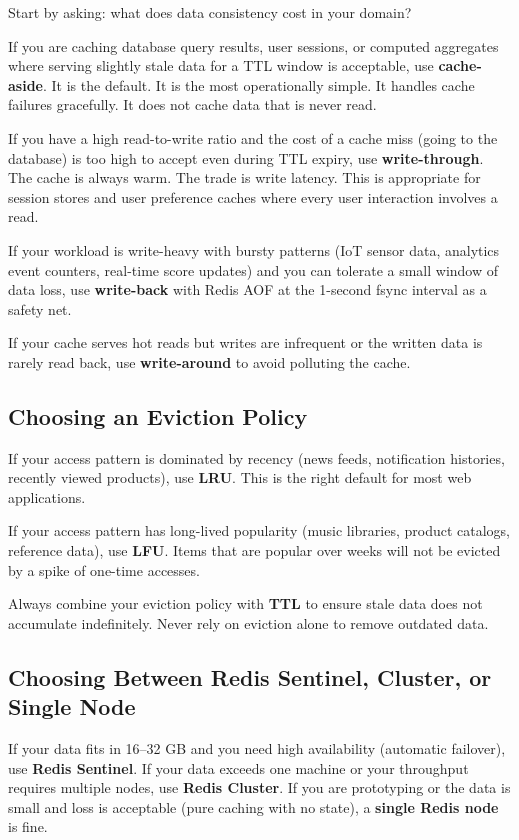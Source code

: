 \documentclass[11pt,a4paper]{article}
\begin{document}
Start by asking: what does data consistency cost in your domain?

If you are caching database query results, user sessions, or computed aggregates where serving slightly stale data for a TTL window is acceptable, use \textbf{cache-aside}. It is the default. It is the most operationally simple. It handles cache failures gracefully. It does not cache data that is never read.

If you have a high read-to-write ratio and the cost of a cache miss (going to the database) is too high to accept even during TTL expiry, use \textbf{write-through}. The cache is always warm. The trade is write latency. This is appropriate for session stores and user preference caches where every user interaction involves a read.

If your workload is write-heavy with bursty patterns (IoT sensor data, analytics event counters, real-time score updates) and you can tolerate a small window of data loss, use \textbf{write-back} with Redis AOF at the 1-second fsync interval as a safety net.

If your cache serves hot reads but writes are infrequent or the written data is rarely read back, use \textbf{write-around} to avoid polluting the cache.

\subsection{Choosing an Eviction Policy}

If your access pattern is dominated by recency (news feeds, notification histories, recently viewed products), use \textbf{LRU}. This is the right default for most web applications.

If your access pattern has long-lived popularity (music libraries, product catalogs, reference data), use \textbf{LFU}. Items that are popular over weeks will not be evicted by a spike of one-time accesses.

Always combine your eviction policy with \textbf{TTL} to ensure stale data does not accumulate indefinitely. Never rely on eviction alone to remove outdated data.

\subsection{Choosing Between Redis Sentinel, Cluster, or Single Node}

If your data fits in 16--32 GB and you need high availability (automatic failover), use \textbf{Redis Sentinel}. If your data exceeds one machine or your throughput requires multiple nodes, use \textbf{Redis Cluster}. If you are prototyping or the data is small and loss is acceptable (pure caching with no state), a \textbf{single Redis node} is fine.
\end{document}
